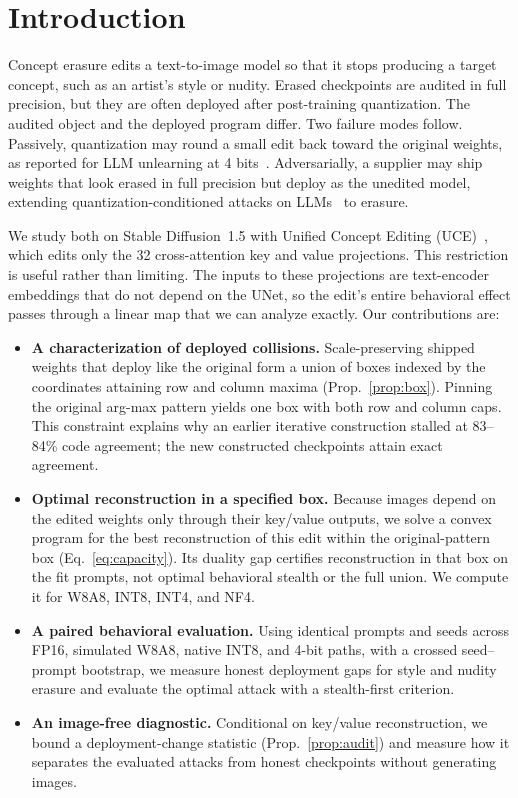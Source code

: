 \section{Introduction}
Concept erasure edits a text-to-image model so that it stops producing a target
concept, such as an artist's style or nudity. Erased checkpoints are audited in full
precision, but they are often deployed after post-training quantization. The audited
object and the deployed program differ. Two failure modes follow. Passively,
quantization may round a small edit back toward the original weights, as reported for
LLM unlearning at 4 bits~\cite{zhang2025}. Adversarially, a supplier may ship weights
that look erased in full precision but deploy as the unedited model, extending
quantization-conditioned attacks on LLMs~\cite{egashira2024,egashira2025} to erasure.

We study both on Stable Diffusion~1.5 with Unified Concept Editing
(UCE)~\cite{uce}, which edits only the 32 cross-attention key and value
projections. This restriction is useful rather than limiting. The inputs to these
projections are text-encoder embeddings that do not depend on the UNet, so the edit's
entire behavioral effect passes through a linear map that we can analyze exactly.
Our contributions are:

\begin{itemize}
\item \textbf{A characterization of deployed collisions.} Scale-preserving shipped
weights that deploy like the original form a union of boxes indexed by the coordinates
attaining row and column maxima (Prop.~\ref{prop:box}). Pinning the original arg-max
pattern yields one box with both row and column caps. This constraint explains why an
earlier iterative construction stalled at 83--84\% code agreement; the new constructed
checkpoints attain exact agreement.
\item \textbf{Optimal reconstruction in a specified box.} Because images depend on
the edited weights only through their key/value outputs, we solve a convex program
for the best reconstruction of this edit within the original-pattern box
(Eq.~\ref{eq:capacity}). Its duality gap certifies reconstruction in that box on the fit
prompts, not optimal behavioral stealth or the full union. We compute it for W8A8,
INT8, INT4, and NF4.
\item \textbf{A paired behavioral evaluation.} Using identical prompts and seeds across
FP16, simulated W8A8, native INT8, and 4-bit paths, with a crossed seed--prompt
bootstrap, we measure honest deployment gaps for style and nudity erasure and evaluate
the optimal attack with a stealth-first criterion.
\item \textbf{An image-free diagnostic.} Conditional on key/value reconstruction,
we bound a deployment-change statistic (Prop.~\ref{prop:audit}) and measure how it
separates the evaluated attacks from honest checkpoints without generating images.
\end{itemize}

